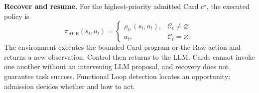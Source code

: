 \textbf{Recover and resume.} For the highest-priority admitted Card
$c^\star$, the executed policy is
\begin{equation}
\pi_{\mathrm{ACE}}(s_t,a_t)=
\begin{cases}
\rho_{c^\star}(s_t,a_t), & \mathcal{C}_t\neq\varnothing,\\
 a_t, & \mathcal{C}_t=\varnothing,
\end{cases}
\label{eq:controller}
\end{equation}
The environment executes the bounded Card program or the Raw action and returns
a new observation. Control then returns to the LLM. Cards cannot invoke one
another without an intervening LLM proposal, and recovery does not guarantee
task success. Functional Loop detection locates an opportunity; admission
decides whether and how to act.
